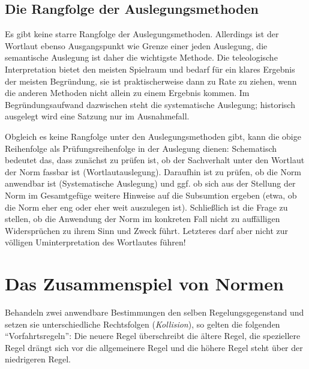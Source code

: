 \subsection{Die Rangfolge der Auslegungsmethoden}
Es gibt keine starre Rangfolge der Auslegungsmethoden.
Allerdings ist der Wortlaut ebenso Ausgangspunkt wie Grenze einer jeden Auslegung, die semantische Auslegung ist daher die wichtigste Methode.
Die teleologische Interpretation bietet den meisten Spielraum und bedarf für ein klares Ergebnis der meisten Begründung, sie ist praktischerweise dann zu Rate zu ziehen, wenn die anderen Methoden nicht allein zu einem Ergebnis kommen.
Im Begründungsaufwand dazwischen steht die systematische Auslegung; historisch ausgelegt wird eine Satzung nur im Ausnahmefall.

Obgleich es keine Rangfolge unter den Auslegungsmethoden gibt, kann die obige Reihenfolge als Prüfungsreihenfolge in der Auslegung dienen:
Schematisch bedeutet das, dass zunächst zu prüfen ist, ob der Sachverhalt unter den Wortlaut der Norm fassbar ist (Wortlautauslegung).
Daraufhin ist zu prüfen, ob die Norm anwendbar ist (Systematische Auslegung) und ggf. ob sich aus der Stellung der Norm im Gesamtgefüge weitere Hinweise auf die Subsumtion ergeben (etwa, ob die Norm eher eng oder eher weit auszulegen ist).
Schließlich ist die Frage zu stellen, ob die Anwendung der Norm im konkreten Fall nicht zu auffälligen Widersprüchen zu ihrem Sinn und Zweck führt.
Letzteres darf aber nicht zur völligen Uminterpretation des Wortlautes führen!

\section{Das Zusammenspiel von Normen}
Behandeln zwei anwendbare Bestimmungen den selben Regelungsgegenstand und setzen sie unterschiedliche Rechtsfolgen (\emph{Kollision}), so gelten die folgenden \enquote{Vorfahrtsregeln}:
Die neuere Regel überschreibt die ältere Regel, die speziellere Regel drängt sich vor die allgemeinere Regel und die höhere Regel steht über der niedrigeren Regel.

